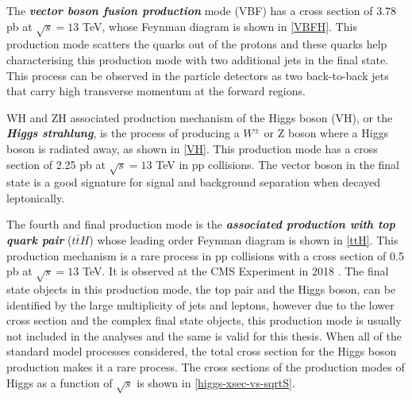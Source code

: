 The \textbf{\emph{vector boson fusion production}} mode (VBF) has a cross section of 3.78 pb at $\sqrt{s}=13$ TeV, whose Feynman diagram is shown in \autoref{VBFH}. This production mode scatters the quarks out of the protons and these quarks help characterising this production mode with two additional jets in the final state. This process can be observed in the particle detectors as two back-to-back jets that carry high transverse momentum at the forward regions.

WH and ZH associated production mechanism of the Higgs boson (VH), or the \textbf{\emph{Higgs strahlung}}, is the process of producing a $W^\pm$ or Z boson where a Higgs boson is radiated away, as shown in \autoref{VH}. This production mode has a cross section of 2.25 pb at $\sqrt{s}=13$ TeV in pp collisions. The vector boson in the final state is a good signature for signal and background separation when decayed leptonically.

The fourth and final production mode is the \textbf{\emph{associated production with top quark pair}} ($t\bar tH$) whose leading order Feynman diagram is shown in \autoref{ttH}. This production mechanism is a rare process in pp collisions with a cross section of 0.5 pb at $\sqrt{s} = 13$ TeV. It is observed at the CMS Experiment in 2018 \cite{ttH-higgs}. The final state objects in this production mode, the top pair and the Higgs boson, can be identified by the large multiplicity of jets and leptons, however due to the lower cross section and the complex final state objects, this production mode is usually not included in the analyses and the same is valid for this thesis. When all of the standard model processes considered, the total cross section for the Higgs boson production makes it a rare process. The cross sections of the production modes of Higgs as a function of $\sqrt{s}$ is shown in \autoref{higgs-xsec-vs-sqrtS}.

